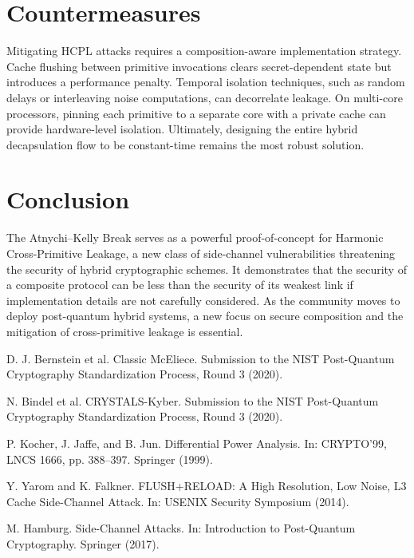 \documentclass[runningheads]{llncs}
\begin{document}
\section{Countermeasures}
Mitigating HCPL attacks requires a composition-aware implementation strategy. Cache flushing between primitive invocations clears secret-dependent state but introduces a performance penalty. Temporal isolation techniques, such as random delays or interleaving noise computations, can decorrelate leakage. On multi-core processors, pinning each primitive to a separate core with a private cache can provide hardware-level isolation. Ultimately, designing the entire hybrid decapsulation flow to be constant-time remains the most robust solution.

\section{Conclusion}
The Atnychi--Kelly Break serves as a powerful proof-of-concept for Harmonic Cross-Primitive Leakage, a new class of side-channel vulnerabilities threatening the security of hybrid cryptographic schemes. It demonstrates that the security of a composite protocol can be less than the security of its weakest link if implementation details are not carefully considered. As the community moves to deploy post-quantum hybrid systems, a new focus on secure composition and the mitigation of cross-primitive leakage is essential.

\begin{thebibliography}{9}
D. J. Bernstein et al. Classic McEliece. Submission to the NIST Post-Quantum Cryptography Standardization Process, Round 3 (2020).

N. Bindel et al. CRYSTALS-Kyber. Submission to the NIST Post-Quantum Cryptography Standardization Process, Round 3 (2020).

P. Kocher, J. Jaffe, and B. Jun. Differential Power Analysis. In: CRYPTO'99, LNCS 1666, pp. 388--397. Springer (1999).

Y. Yarom and K. Falkner. FLUSH+RELOAD: A High Resolution, Low Noise, L3 Cache Side-Channel Attack. In: USENIX Security Symposium (2014).

M. Hamburg. Side-Channel Attacks. In: Introduction to Post-Quantum Cryptography. Springer (2017).
\end{thebibliography}
\end{document}
